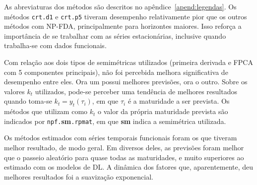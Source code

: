 \documentclass[
	12pt,				%
	openright,			%
	oneside,			%
	a4paper,			%
	english,			%
	brazil				%
	]{dissertacao-ufrgs-abntex2}
\begin{document}
As abreviaturas dos métodos são descritos no apêndice~\ref{apend:legendas}. Os métodos \texttt{crt.d1} e \texttt{crt.p5} tiveram desempenho relativamente pior que os outros métodos com NP-FDA, principalmente para horizontes maiores. Isso reforça a importância de se trabalhar com as séries estacionárias, inclusive quando trabalha-se com dados funcionais. 

Com relação aos dois tipos de semimétricas utilizados (primeira derivada e FPCA com 5 componentes principais), não foi percebida melhora significativa de desempenho entre eles. Ora um possui melhores previsões, ora o outro. Sobre os valores $k_t$ utilizados, pode-se perceber uma tendência de melhores resultados quando toma-se $k_t = y_t(\tau_i)$, em que $\tau_i$ é a maturidade a ser prevista. Os métodos que utilizam como $k_t$ o valor da própria maturidade prevista são indicados por \texttt{npf.}\textbf{sm}\texttt{.rpmat}, em que \textbf{sm} indica a semimétrica utilizada.

Os métodos estimados com séries temporais funcionais foram os que tiveram melhor resultado, de modo geral. Em diversos deles, as previsões foram melhor que o passeio aleatório para quase todas as maturidades, e muito superiores ao estimado com os modelos de DL. A dinâmica dos fatores que, aparentemente, deu melhores resultados foi a suavização exponencial. 



%



\end{document}
